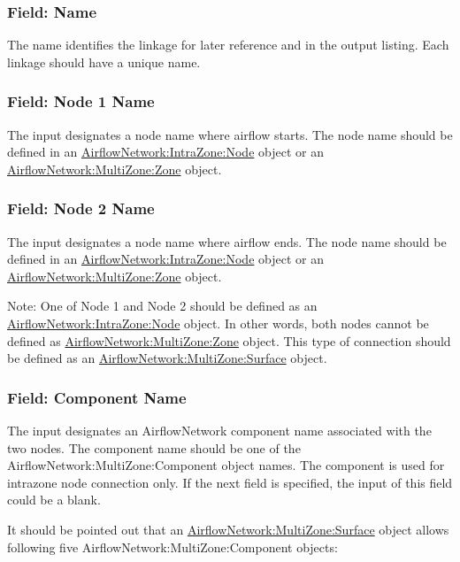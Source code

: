 \subsubsection{Field: Name}\label{field-name-13-000}

The name identifies the linkage for later reference and in the output listing. Each linkage should have a unique name.

\subsubsection{Field: Node 1 Name}\label{field-node-1-name}

The input designates a node name where airflow starts. The node name should be defined in an \hyperref[airflownetworkintrazonenode]{AirflowNetwork:IntraZone:Node} object or an \hyperref[airflownetworkmultizonezone]{AirflowNetwork:MultiZone:Zone} object.

\subsubsection{Field: Node 2 Name}\label{field-node-2-name}

The input designates a node name where airflow ends. The node name should be defined in an \hyperref[airflownetworkintrazonenode]{AirflowNetwork:IntraZone:Node} object or an \hyperref[airflownetworkmultizonezone]{AirflowNetwork:MultiZone:Zone} object.

Note: One of Node 1 and Node 2 should be defined as an \hyperref[airflownetworkintrazonenode]{AirflowNetwork:IntraZone:Node} object. In other words, both nodes cannot be defined as \hyperref[airflownetworkmultizonezone]{AirflowNetwork:MultiZone:Zone} object. This type of connection should be defined as an \hyperref[airflownetworkmultizonesurface]{AirflowNetwork:MultiZone:Surface} object.

\subsubsection{Field: Component Name}\label{field-component-name-000}

The input designates an AirflowNetwork component name associated with the two nodes. The component name should be one of the AirflowNetwork:MultiZone:Component object names. The component is used for intrazone node connection only. If the next field is specified, the input of this field could be a blank.

It should be pointed out that an \hyperref[airflownetworkmultizonesurface]{AirflowNetwork:MultiZone:Surface} object allows following five AirflowNetwork:MultiZone:Component objects:

